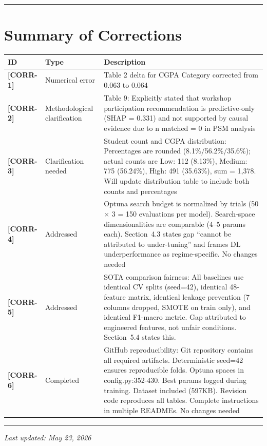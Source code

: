 \documentclass[11pt,a4paper]{article}
\newcommand{\cid}[1]{\textcolor{revred}{\textbf{[#1]}}}
\newcommand{\sectref}[1]{Section~#1}
\begin{document}

\vspace{12pt}
\hrule
\vspace{6pt}

\section*{Summary of Corrections}

\begin{center}
\begin{tabular}{l l p{8cm}}
\toprule
\textbf{ID} & \textbf{Type} & \textbf{Description} \\
\midrule
\cid{CORR-1} & Numerical error & Table 2 delta for CGPA Category corrected from 0.063 to 0.064 \\
\cid{CORR-2} & Methodological clarification & Table 9: Explicitly stated that workshop participation recommendation is predictive-only (SHAP = 0.331) and not supported by causal evidence due to n matched = 0 in PSM analysis \\
\cid{CORR-3} & Clarification needed & Student count and CGPA distribution: Percentages are rounded (8.1\%/56.2\%/35.6\%); actual counts are Low: 112 (8.13\%), Medium: 775 (56.24\%), High: 491 (35.63\%), sum = 1,378. Will update distribution table to include both counts and percentages \\
\cid{CORR-4} &  Addressed & Optuna search budget is normalized by trials (50 $\times$ 3 = 150 evaluations per model). Search-space dimensionalities are comparable (4--5 params each). \sectref{4.3}  states gap ``cannot be attributed to under-tuning'' and frames DL underperformance as regime-specific. No changes needed \\
\cid{CORR-5} & Addressed & SOTA comparison fairness: All baselines use identical CV splits (seed=42), identical 48-feature matrix, identical leakage prevention (7 columns dropped, SMOTE on train only), and identical F1-macro metric. Gap attributed to engineered features, not unfair conditions. \sectref{5.4} states this. \\
\cid{CORR-6} & Completed & GitHub reproducibility: Git repository contains all required artifacts. Deterministic seed=42 ensures reproducible folds. Optuna spaces in config.py:352-430. Best params logged during training. Dataset included (597KB). Revision code reproduces all tables. Complete instructions in multiple READMEs. No changes needed \\
\midrule
\bottomrule
\end{tabular}
\end{center}

\vspace{6pt}
\hrule
\vspace{6pt}

\noindent \textit{Last updated: May 23, 2026}
\end{document}
